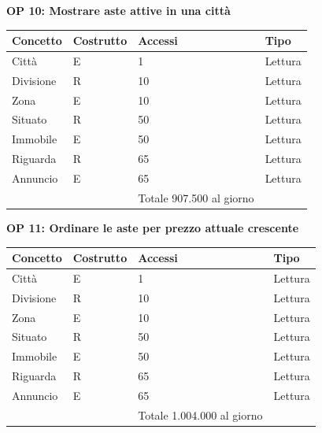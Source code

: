 \documentclass[a4paper,12pt]{report}
\begin{document}
            \textbf{OP 10: Mostrare aste attive in una città}
        	\begin{table}[H]
            \centering
             \begin{tabular}{||l l l l||}
             \hline
             Concetto & Costrutto & Accessi & Tipo \\ [0.5ex] 
             \hline\hline
             Città & E & 1 & Lettura \\ 
             Divisione & R & 10 & Lettura \\ 
             Zona & E & 10 & Lettura \\ 
             Situato & R & 50 & Lettura \\ 
             Immobile & E & 50 & Lettura \\ 
             Riguarda & R & 65 & Lettura \\ 
             Annuncio & E & 65 & Lettura \\ 
             \hline
                &   & Totale  907.500 al giorno &  \\ [1ex] 
             \hline
             \end{tabular}
            \end{table}

            \textbf{OP 11: Ordinare le aste per prezzo attuale crescente}
        	\begin{table}[H]
            \centering
             \begin{tabular}{||l l l l||}
             \hline
             Concetto & Costrutto & Accessi & Tipo \\ [0.5ex] 
             \hline\hline
             Città & E & 1 & Lettura \\ 
             Divisione & R & 10 & Lettura \\ 
             Zona & E & 10 & Lettura \\ 
             Situato & R & 50 & Lettura \\ 
             Immobile & E & 50 & Lettura \\ 
             Riguarda & R & 65 & Lettura \\ 
             Annuncio & E & 65 & Lettura \\ 
             \hline
                &   & Totale  1.004.000 al giorno &  \\ [1ex] 
             \hline
             \end{tabular}
            \end{table}
\end{document}
